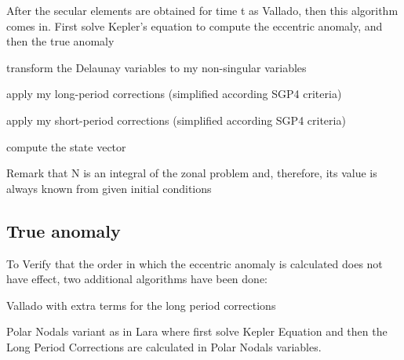 \documentclass{article}
\begin{document}
After the secular elements are obtained for time t as Vallado, then this algorithm
comes in. First solve Kepler's equation to compute the eccentric anomaly, and then the
true anomaly

transform the Delaunay variables to my non-singular variables

apply my long-period corrections (simplified according SGP4 criteria)

apply my short-period corrections (simplified according SGP4 criteria)

compute the state vector

Remark that N is an integral of the zonal problem and, therefore, its value is always known from given initial conditions


\subsection{True anomaly}
\label{sec:trueanomaly}
To Verify that the order in which the eccentric anomaly is calculated does not have effect,
two additional algorithms have been done:

Vallado with extra terms for the long period corrections

Polar Nodals variant as in Lara where first solve Kepler Equation and then the Long Period Corrections are calculated in Polar Nodals variables.




\end{document}
